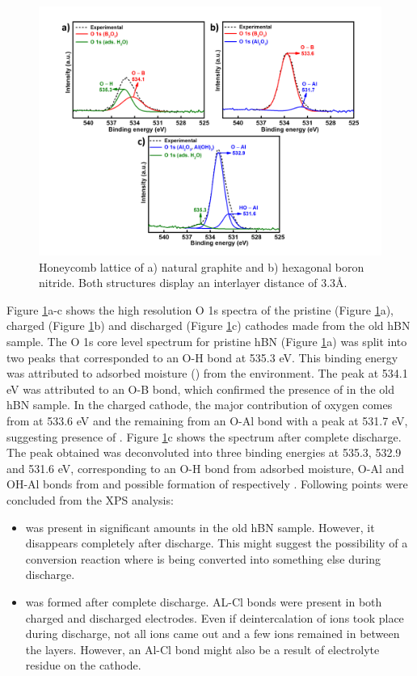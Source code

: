 \begin{figure}[tbh!]
\centering
\includegraphics[width=\textwidth]{Figures/BOhBN/hBNOXPS}
\caption{Honeycomb lattice of a) natural graphite and b) hexagonal boron nitride. Both structures display an interlayer distance of 3.3\AA.}
\label{Figures/BOhBN:hBNOXPS}
\end{figure}

Figure \ref{Figures/BOhBN:hBNOXPS}a-c shows the high resolution O 1s spectra of the pristine (Figure \ref{Figures/BOhBN:hBNOXPS}a), charged (Figure \ref{Figures/BOhBN:hBNOXPS}b) and discharged (Figure \ref{Figures/BOhBN:hBNOXPS}c) cathodes made from the old hBN sample. The O 1s core level spectrum for pristine hBN (Figure \ref{Figures/BOhBN:hBNOXPS}a) was split into two peaks that corresponded to an O-H bond at 535.3 eV. This binding energy was attributed to adsorbed moisture () from the environment. The peak at 534.1 eV was attributed to an O-B bond, which confirmed the presence of  in the old hBN sample. In the charged cathode, the major contribution of oxygen comes from  at 533.6 eV and the remaining from an O-Al bond with a peak at 531.7 eV, suggesting presence of .  Figure \ref{Figures/BOhBN:hBNOXPS}c shows the spectrum after complete discharge. The peak obtained was deconvoluted into three binding energies at 535.3, 532.9 and 531.6 eV, corresponding to an O-H bond from adsorbed moisture, O-Al and OH-Al bonds from  and possible formation of  respectively \cite{}. Following points were concluded from the XPS analysis:
\begin{itemize}
    \item {} was present in significant amounts in the old hBN sample. However, it disappears completely after discharge. This might suggest the possibility of a conversion reaction where  is being converted into something else during discharge.  
    \item {} was formed after complete discharge. AL-Cl bonds were present in both charged and discharged electrodes. Even if deintercalation of ions took place during discharge, not all ions came out and a few  ions remained in between the layers. However, an Al-Cl bond might also be a result of electrolyte residue on the cathode. 
\end{itemize}

